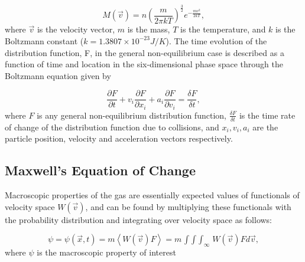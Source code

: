 \documentclass[titlepage,11pt,letterpaper]{article}
\begin{document}
\begin{equation}\label{eq:Max-Boltz}
M(\vec{v}) = n\left(\frac{m}{2\pi kT}\right)^{
\frac{3}{2}}e^{-\frac{mv^{2}}{2kT}},
\end{equation}
%
where $\vec v$ is the velocity vector, $m$ is the mass, $T$ is the temperature, and $k$ is 
the Boltzmann constant ($k = 1.3807 \times 10^{-23} J/K$). The time evolution of the 
distribution function, F, in the general non-equilibrium case is described as a function of 
time and location in the six-dimensional phase space through the Boltzmann equation given by

\begin{equation}\label{eq:Boltz-EQ}
\frac{\partial F}{\partial t} + v_i\frac{\partial F}{\partial x_i} 
+ a_i\frac{\partial F}{\partial v_i} = \frac{\delta F}{\delta t},
\end{equation}
%
where $F$ is any general non-equilibrium distribution function, $\frac{\delta F}{\delta t}$ 
is the time rate of change of the distribution function due to collisions, and 
$x_{i}, v_{i}, a_{i}$ are the particle position, velocity and acceleration vectors respectively.

\subsection{Maxwell's Equation of Change}
Macroscopic properties of the gas are essentially expected values of functionals of 
velocity space $W(\vec{v})$, and can be found by multiplying these functionals with the 
probability distribution and integrating over velocity space as follows:

\begin{equation}\label{eq:Boltz-EQ2}
\psi = \psi(\vec{x},t)=m\left<W(\vec{v})F\right> = m\mathop{\int\!\!\int\!\!\int}_{\infty}W(\vec{v})F d \vec v ,
\end{equation}
%
where $\psi$ is the macroscopic property of interest
\end{document}
